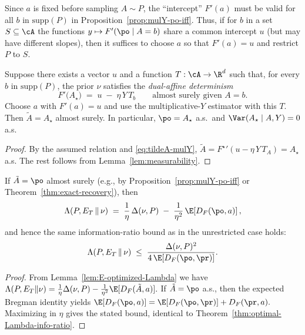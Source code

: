 \begin{remark}
    \label{rem:common-intercept}
    Since $a$ is fixed before sampling $A\sim P$, the “intercept”
    $F'(a)$ must be valid for all $b$ in $\mathrm{supp}(P)$
    in Proposition~\ref{prop:mulY-po-iff}. Thus, if for $b$ in a set
    $S\subseteq\cA$ the functions $y\mapsto F'(\po\mid A=b)$ share a common
    intercept $u$ (but may have different slopes), then it suffices to choose $a$
    so that $F'(a)=u$ and restrict $P$ to $S$.
\end{remark}

\begin{theorem}[Exact recovery $\tilde{A}=A_\star$ a.s.: dual-affine determinism]
    \label{thm:exact-recovery}
    Suppose there exists a vector $u$ and a function $T:\cA\to\R^d$ such that, for every
    $b$ in $\mathrm{supp}(P)$, the prior $\nu$ satisfies the \emph{dual-affine determinism}
    \[
        F'\!\big(A_\star\big) \;=\; u\;-\;\eta\,Y\,T_b
        \qquad\text{almost surely given } A=b.
    \]
    Choose $a$ with $F'(a)=u$ and use the multiplicative-$Y$ estimator with this $T$.
    Then $\tilde{A}=A_\star$ almost surely. In particular, $\po=A_\star$ a.s.\ and
    $\Var(A_\star\mid A,Y)=0$ a.s.
\end{theorem}

\begin{proof}
    By the assumed relation and \eqref{eq:tildeA-mulY},
    \(
    \tilde{A}={F^\star}'(u-\eta\,Y\,T_A)=A_\star
    \)
    a.s. The rest follows from Lemma~\ref{lem:measurability}.
\end{proof}

\begin{corollary}
    \label{cor:IR-mulY}
    If $\tilde{A}=\po$ almost surely (e.g., by Proposition~\ref{prop:mulY-po-iff}
    or Theorem~\ref{thm:exact-recovery}), then
    \[
        \Lambda(P, E_T \,\Vert\, \nu)
        \;=\;
        \frac{1}{\eta}\,\Delta(\nu,P)
        \;-\;\frac{1}{\eta^2}\,\E\!\left[D_F\!\left(\po,a\right)\right],
    \]
    and hence the same information-ratio bound as in the unrestricted case holds:
    \[
        \Lambda(P, E_T \,\Vert\, \nu)
        \;\le\;
        \frac{\Delta(\nu,P)^2}{4\,\E\!\left[D_F(\po,\pr)\right]}.
    \]
\end{corollary}

\begin{proof}
    From Lemma~\ref{lem:E-optimized-Lambda} we have
    \(
    \Lambda(P,E_T\Vert\nu)
    = \frac{1}{\eta}\Delta(\nu,P)-\frac{1}{\eta^2}\E[D_F(\tilde{A},a)].
    \)
    If $\tilde{A}=\po$ a.s., then the expected Bregman identity yields
    \(
    \E[D_F(\po,a)]=\E[D_F(\po,\pr)]+D_F(\pr,a).
    \)
    Maximizing in $\eta$ gives the stated bound, identical to
    Theorem~\ref{thm:optimal-Lambda-info-ratio}.
\end{proof}

